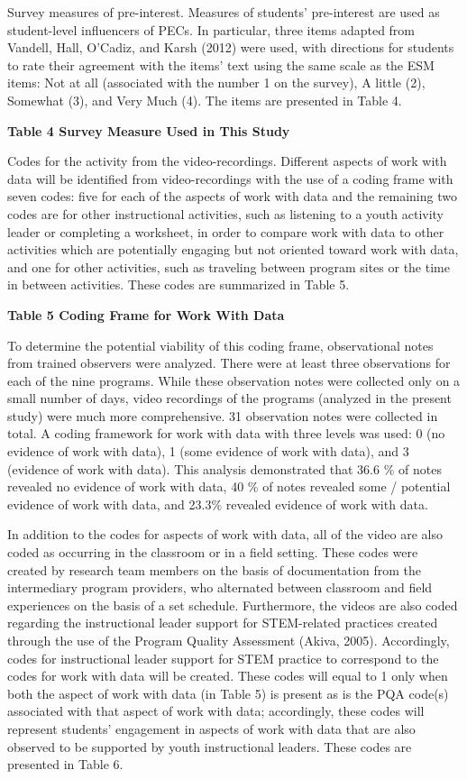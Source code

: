 \documentclass[]{book}
\theoremstyle{definition}
\theoremstyle{definition}
\theoremstyle{definition}
\theoremstyle{remark}
\begin{document}
Survey measures of pre-interest. Measures of students' pre-interest are
used as student-level influencers of PECs. In particular, three items
adapted from Vandell, Hall, O'Cadiz, and Karsh (2012) were used, with
directions for students to rate their agreement with the items' text
using the same scale as the ESM items: Not at all (associated with the
number 1 on the survey), A little (2), Somewhat (3), and Very Much (4).
The items are presented in Table 4.

\textbf{Table 4 Survey Measure Used in This Study}

Codes for the activity from the video-recordings. Different aspects of
work with data will be identified from video-recordings with the use of
a coding frame with seven codes: five for each of the aspects of work
with data and the remaining two codes are for other instructional
activities, such as listening to a youth activity leader or completing a
worksheet, in order to compare work with data to other activities which
are potentially engaging but not oriented toward work with data, and one
for other activities, such as traveling between program sites or the
time in between activities. These codes are summarized in Table 5.

\textbf{Table 5 Coding Frame for Work With Data}

To determine the potential viability of this coding frame, observational
notes from trained observers were analyzed. There were at least three
observations for each of the nine programs. While these observation
notes were collected only on a small number of days, video recordings of
the programs (analyzed in the present study) were much more
comprehensive. 31 observation notes were collected in total. A coding
framework for work with data with three levels was used: 0 (no evidence
of work with data), 1 (some evidence of work with data), and 3 (evidence
of work with data). This analysis demonstrated that 36.6 \% of notes
revealed no evidence of work with data, 40 \% of notes revealed some /
potential evidence of work with data, and 23.3\% revealed evidence of
work with data.

In addition to the codes for aspects of work with data, all of the video
are also coded as occurring in the classroom or in a field setting.
These codes were created by research team members on the basis of
documentation from the intermediary program providers, who alternated
between classroom and field experiences on the basis of a set schedule.
Furthermore, the videos are also coded regarding the instructional
leader support for STEM-related practices created through the use of the
Program Quality Assessment (Akiva, 2005). Accordingly, codes for
instructional leader support for STEM practice to correspond to the
codes for work with data will be created. These codes will equal to 1
only when both the aspect of work with data (in Table 5) is present as
is the PQA code(s) associated with that aspect of work with data;
accordingly, these codes will represent students' engagement in aspects
of work with data that are also observed to be supported by youth
instructional leaders. These codes are presented in Table 6.
\end{document}
